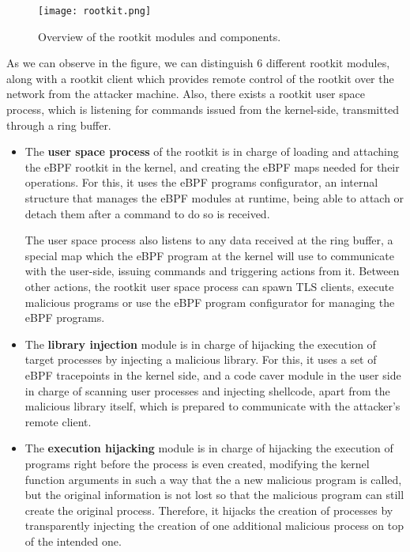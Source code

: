\thispagestyle{lscape}
\begin{landscape}
\begin{figure}[htbp]
	\centering
	\texttt{[image: rootkit.png]}
	\caption{Overview of the rootkit modules and components.}
	\label{fig:rootkit}
\end{figure}
\end{landscape}
\restoregeometry

As we can observe in the figure, we can distinguish 6 different rootkit modules, along with a rootkit client which provides remote control of the rootkit over the network from the attacker machine. Also, there exists a rootkit user space process, which is listening for commands issued from the kernel-side, transmitted through a ring buffer.
\begin{itemize}
\item The \textbf{user space process} of the rootkit is in charge of loading and attaching the eBPF rootkit in the kernel, and creating the eBPF maps needed for their operations. For this, it uses the eBPF programs configurator, an internal structure that manages the eBPF modules at runtime, being able to attach or detach them after a command to do so is received.

The user space process also listens to any data received at the ring buffer, a special map which the eBPF program at the kernel will use to communicate with the user-side, issuing commands and triggering actions from it. Between other actions, the rootkit user space process can spawn TLS clients, execute malicious programs or use the eBPF program configurator for managing the eBPF programs.

\item The \textbf{library injection} module is in charge of hijacking the execution of target processes by injecting a malicious library. For this, it uses a set of eBPF tracepoints in the kernel side, and a code caver module in the user side in charge of scanning user processes and injecting shellcode, apart from the malicious library itself, which is prepared to communicate with the attacker's remote client.

\item The \textbf{execution hijacking} module is in charge of hijacking the execution of programs right before the process is even created, modifying the kernel function arguments in such a way that the a new malicious program is called, but the original information is not lost so that the malicious program can still create the original process. Therefore, it hijacks the creation of processes by transparently injecting the creation of one additional malicious process on top of the intended one.


\end{itemize}
